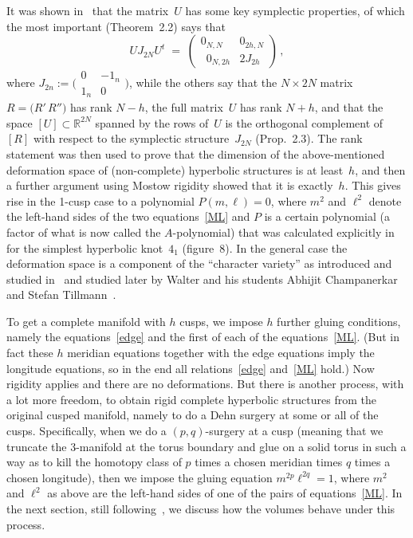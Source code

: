 \documentclass[12pt,reqno]{amsart}
\theoremstyle{definition}
\def\={\;=\;}
\def\be{\begin{equation}}
\def\ee{\end{equation}}
\def\R{\mathbb R}
\begin{document}
It was shown in~\cite{NZ} that the matrix~$U$ has some key symplectic properties, of which
the most important (Theorem~2.2) says that
\be\label{Th2.2} 
U J_{2N}U^t \= 
\begin{pmatrix} 0_{N,N}& 0_{2h,N} \\ \phantom2 0_{N,2h}  & 2 J_{2h} \end{pmatrix}\,,
\ee
where $J_{2n}:=\bigl(\!\begin{smallmatrix} 0&-1_n\\1_n&0\end{smallmatrix}\!\bigr)$, while
the others say that the $N\times2N$ matrix $R=\bigl(R'\,R''\bigr)$ has rank $N-h$,
the full matrix~$U$
has rank $N+h$, and that the space $[U]\subset\R^{2N}$ spanned by the rows of~$U$ is the 
orthogonal complement of~$[R]$ with respect to the symplectic structure~$J_{2N}$ (Prop.~2.3).
The rank statement was then used to prove that the dimension of the above-mentioned
deformation space of (non-complete) hyperbolic structures is at least~$h$, and then a
further argument using Mostow rigidity showed that it is exactly~$h$.  This gives rise in
the 1-cusp case to a polynomial $P(m,\ell)=0$, where $m^2$ and $\ell^2$ denote the
left-hand sides of the two equations~\eqref{ML} and $P$ is a certain polynomial (a factor
of what is now called the $A$-polynomial) that was calculated explicitly in~\cite{NZ} for 
the simplest hyperbolic knot~$4_1$ (figure~8).  In the general case the deformation space
is a component of the ``character variety'' as introduced and studied in~\cite{CCGLS} and
studied later by Walter and his students Abhijit Champanerkar~\cite{Champanerkar} and
Stefan Tillmann~\cite{Tillmann:bs}.

To get a complete manifold with $h$ cusps, we impose $h$ further gluing conditions, namely the
equations~\eqref{edge} and the first of each of the equations~\eqref{ML}. (But in fact these
$h$ meridian equations together with the edge equations imply the longitude equations, so in
the end all relations~\eqref{edge} and~\eqref{ML} hold.)  Now rigidity applies and there are 
no deformations.  But there is another process, with a lot more freedom, to obtain rigid
complete hyperbolic structures from the original cusped manifold, namely to do a Dehn 
surgery at some or all of the cusps.  Specifically, when we do a $(p,q)$-surgery at a
cusp (meaning that we truncate the \hbox{3-manifold} at the torus boundary and glue on a solid
torus in such a way as to kill the homotopy class of $p$ times a chosen meridian times $q$
times a chosen longitude), then we impose the gluing equation $m^{2p}\ell^{2q}=1$, where
$m^2$ and $\ell^2$ as above are the left-hand sides of one of the pairs of
equations~\eqref{ML}.  In the next section, still following~\cite{NZ}, we discuss how the
volumes behave under this process.
\end{document}
